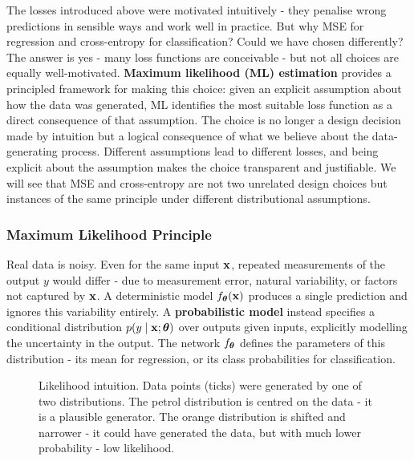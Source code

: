 The losses introduced above were motivated intuitively - they penalise wrong predictions in sensible ways and work well in practice. But why MSE for regression and cross-entropy for classification? Could we have chosen differently? The answer is yes - many loss functions are conceivable - but not all choices are equally well-motivated. \textbf{Maximum likelihood (ML) estimation} provides a principled framework for making this choice: given an explicit assumption about how the data was generated, ML identifies the most suitable loss function as a direct consequence of that assumption. The choice is no longer a design decision made by intuition but a logical consequence of what we believe about the data-generating process. Different assumptions lead to different losses, and being explicit about the assumption makes the choice transparent and justifiable. We will see that MSE and cross-entropy are not two unrelated design choices but instances of the same principle under different distributional assumptions.

\subsubsection{Maximum Likelihood Principle}

Real data is noisy. Even for the same input $\mathbf{x}$, repeated measurements of the output $y$ would differ - due to measurement error, natural variability, or factors not captured by $\mathbf{x}$. A deterministic model $f_{\boldsymbol{\theta}}(\mathbf{x})$ produces a single prediction and ignores this variability entirely. A \textbf{probabilistic model} instead specifies a conditional distribution $p(y \mid \mathbf{x}; \boldsymbol{\theta})$ over outputs given inputs, explicitly modelling the uncertainty in the output. The network $f_{\boldsymbol{\theta}}$ defines the parameters of this distribution - its mean for regression, or its class probabilities for classification.

\begin{figure}
\centering
{}
\resizebox{0.40\textwidth}{!}{}
\caption{Likelihood intuition. Data points (ticks) were generated by one of two distributions. The petrol distribution is centred on the data - it is a plausible generator. The orange distribution is shifted and narrower - it could have generated the data, but with much lower probability - low likelihood.}
\label{fig:likelihood}
\end{figure}


